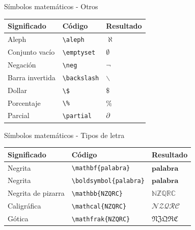 \documentclass[
  ignorenonframetext,
  aspectratio=169]{beamer}
\begin{document}
\begin{frame}[fragile]{Símbolos matemáticos - Otros}
\protect\hypertarget{suxedmbolos-matemuxe1ticos---otros-1}{}
\begin{longtable}[]{@{}lll@{}}
\toprule()
Significado & Código & Resultado \\
\midrule()
\endhead
Aleph & \texttt{\textbackslash{}aleph} & \(\aleph\) \\
Conjunto vacío & \texttt{\textbackslash{}emptyset} & \(\emptyset\) \\
Negación & \texttt{\textbackslash{}neg} & \(\neg\) \\
Barra invertida & \texttt{\textbackslash{}backslash} & \(\backslash\) \\
Dollar & \texttt{\textbackslash{}\$} & \(\$\) \\
Porcentaje & \texttt{\textbackslash{}\%} & \(\%\) \\
Parcial & \texttt{\textbackslash{}partial} & \(\partial\) \\
\bottomrule()
\end{longtable}
\end{frame}

\begin{frame}[fragile]{Símbolos matemáticos - Tipos de letra}
\protect\hypertarget{suxedmbolos-matemuxe1ticos---tipos-de-letra}{}
\begin{longtable}[]{@{}lll@{}}
\toprule()
Significado & Código & Resultado \\
\midrule()
\endhead
Negrita & \texttt{\textbackslash{}mathbf\{palabra\}} &
\(\mathbf{palabra}\) \\
Negrita & \texttt{\textbackslash{}boldsymbol\{palabra\}} &
\(\boldsymbol{palabra}\) \\
Negrita de pizarra & \texttt{\textbackslash{}mathbb\{NZQRC\}} &
\(\mathbb{NZQRC}\) \\
Caligráfica & \texttt{\textbackslash{}mathcal\{NZQRC\}} &
\(\mathcal{NZQRC}\) \\
Gótica & \texttt{\textbackslash{}mathfrak\{NZQRC\}} &
\(\mathfrak{NZQRC}\) \\
\bottomrule()
\end{longtable}
\end{frame}
\end{document}
